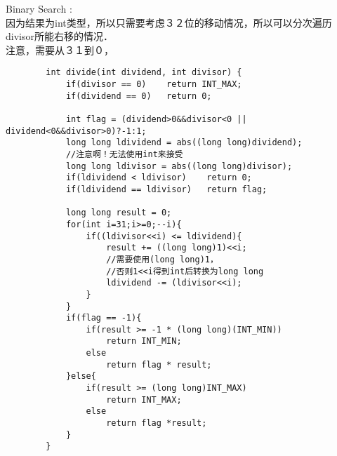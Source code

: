 \begin{description}
	\item{Binary Search} : \\
		因为结果为int类型，所以只需要考虑３２位的移动情况，所以可以分次遍历divisor所能右移的情况．\\
		注意，需要从３１到０，\\
		\begin{lstlisting}
		int divide(int dividend, int divisor) {
			if(divisor == 0)	return INT_MAX;
			if(dividend == 0)	return 0;

			int flag = (dividend>0&&divisor<0 || dividend<0&&divisor>0)?-1:1;
			long long ldividend = abs((long long)dividend);
			//注意啊！无法使用int来接受
			long long ldivisor = abs((long long)divisor);
			if(ldividend < ldivisor)	return 0;
			if(ldividend == ldivisor)	return flag;

			long long result = 0;
			for(int i=31;i>=0;--i){
				if((ldivisor<<i) <= ldividend){
					result += ((long long)1)<<i;
					//需要使用(long long)1，
					//否则1<<i得到int后转换为long long 
					ldividend -= (ldivisor<<i);
				}
			}
			if(flag == -1){
				if(result >= -1 * (long long)(INT_MIN))
					return INT_MIN;
				else
					return flag * result;
			}else{
				if(result >= (long long)INT_MAX)
					return INT_MAX;
				else
					return flag *result;
			}
		}
		\end{lstlisting}

\end{description}

